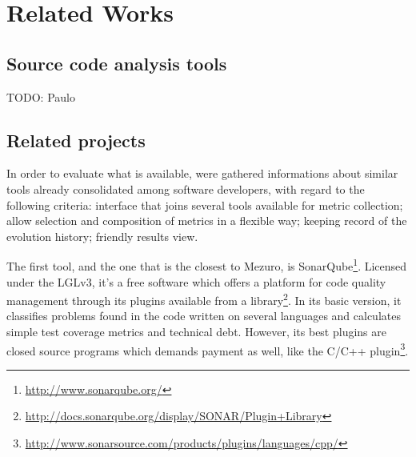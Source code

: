 \section{Related Works}
\label{sec:related_works}


\subsection{Source code analysis tools}
\label{subsec:related-tools}

TODO: Paulo

\subsection{Related projects}
\label{subsec:related-projects}

In order to evaluate what is available, were gathered informations about similar tools already consolidated among software developers, with regard to the following criteria: interface that joins several tools available for metric collection; allow selection and composition of metrics in a flexible way; keeping record of the evolution history; friendly results view.

The first tool, and the one that is the closest to Mezuro, is SonarQube\footnote{\url{http://www.sonarqube.org/}}. Licensed under the LGLv3, it's a free software which offers a platform for code quality management through its plugins available from a library\footnote{\url{http://docs.sonarqube.org/display/SONAR/Plugin+Library}}. In its basic version, it classifies problems found in the code written on several languages and calculates simple test coverage metrics and technical debt. However, its best plugins are closed source programs which demands payment as well, like the C/C++ plugin\footnote{\url{http://www.sonarsource.com/products/plugins/languages/cpp/}}.

